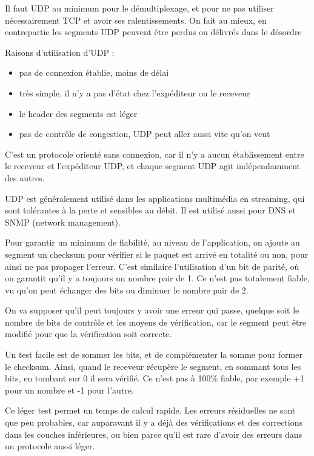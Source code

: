 Il faut UDP au minimum pour le démultiplexage, et pour ne pas utiliser
nécessairement TCP et avoir ses ralentissements. On fait au mieux, en contrepartie les segments UDP peuvent être perdus ou délivrés dans le désordre

Raisons d'utilisation d'UDP :

\begin{itemize}
	\item pas de connexion établie, moins de délai
	\item très simple, il n'y a pas d'état chez l'expéditeur ou le receveur
	\item le header des segments est léger
	\item pas de contrôle de congestion, UDP peut aller aussi vite qu'on veut
\end{itemize}

C'est un protocole orienté sans connexion, car il n'y a aucun établissement entre le receveur et l'expéditeur UDP, et chaque segment UDP agit indépendamment des autres.

UDP est généralement utilisé dans les applications multimédia en streaming, qui sont tolérantes à la perte et sensibles au débit. Il est utilisé aussi pour DNS et SNMP (network management).

Pour garantir un minimum de fiabilité, au niveau de l'application, on ajoute au segment un checksum pour vérifier si le paquet est arrivé en totalité ou non, pour ainsi ne pas propager l'erreur. C'est similaire  l'utilisation d'un bit de parité, où on garantit qu'il y a toujours un nombre pair de 1. Ce n'est pas totalement fiable, vu qu'on peut échanger des bits ou diminuer le nombre pair de 2.

On va supposer qu'il peut toujours y avoir une erreur qui passe, quelque soit le nombre de bits de contrôle et les moyens de vérification, car le segment peut être modifié pour que la vérification soit correcte.

Un test facile est de sommer les bits, et de complémenter la somme pour former le checksum. Ainsi, quand le receveur récupère le segment, en sommant tous les bits, en tombant sur 0 il sera vérifié. Ce n'est pas à 100\% fiable, par exemple +1 pour un nombre et -1 pour l'autre.

Ce léger test permet un temps de calcul rapide. Les erreurs résiduelles ne sont que peu probables, car auparavant il y a déjà des vérifications et des corrections dans les couches inférieures, ou bien parce qu'il est rare d'avoir des erreurs dans un protocole aussi léger.


